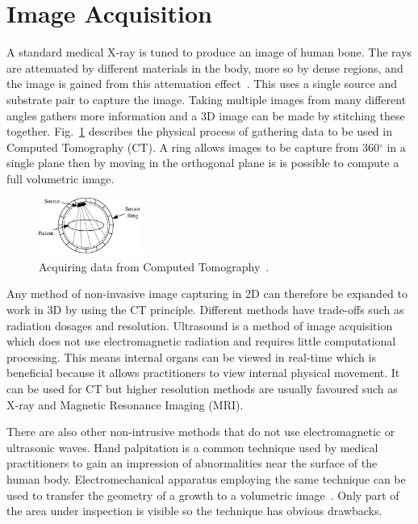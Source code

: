 \documentclass[journal]{IEEEtran}
\begin{document}
\section{Image Acquisition}
\label{sec:image}

A standard medical X-ray is tuned to produce an image of human bone.
The rays are attenuated by different materials in the body, more so by dense regions, and the image is gained from this attenuation effect~\cite{kayvan2006biomedical}. 
This uses a single source and substrate pair to capture the image.
Taking multiple images from many different angles gathers more information and a 3D image can be made by stitching these together.
Fig.~\ref{fig:ct} describes the physical process of gathering data to be used in Computed Tomography (CT).
A ring allows images to be capture from 360$^{\circ}$ in a single plane then by moving in the orthogonal plane is is possible to compute a full volumetric image. 

\begin{figure}[!htb]
   \centering
   \includegraphics[width = 0.3\textwidth]{Figures/CT.pdf}
   \caption{Acquiring data from Computed Tomography~\cite{kayvan2006biomedical}.}
   \label{fig:ct}
\end{figure}

Any method of non-invasive image capturing in 2D can therefore be expanded to work in 3D by using the CT principle.
Different methods have trade-offs such as radiation dosages and resolution.
Ultrasound is a method of image acquisition which does not use electromagnetic radiation and requires little computational processing. 
This means internal organs can be viewed in real-time which is beneficial because it allows practitioners to view internal physical movement. 
It can be used for CT but higher resolution methods are usually favoured such as X-ray and Magnetic Resonance Imaging (MRI).

There are also other non-intrusive methods that do not use electromagnetic or ultrasonic waves.
Hand palpitation is a common technique used by medical practitioners to gain an impression of abnormalities near the surface of the human body. 
Electromechanical apparatus employing the same technique can be used to transfer the geometry of a growth to a volumetric image~\cite{liu09haptic,wellman1997modeling}.  
Only part of the area under inspection is visible so the technique has obvious drawbacks.
\end{document}
